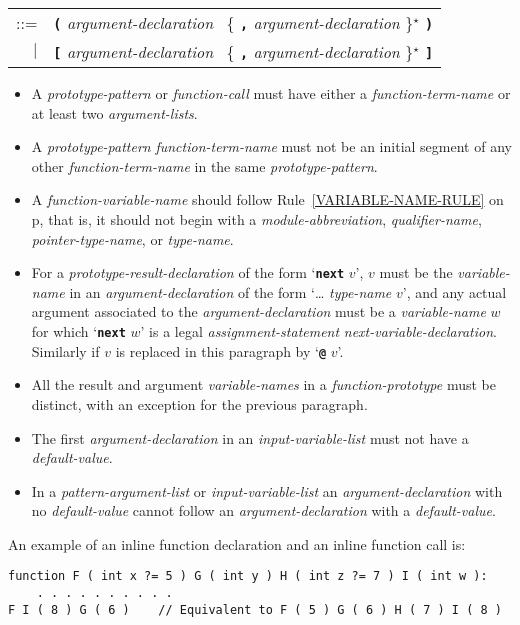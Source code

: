 \documentclass[12pt]{article}
\newcommand{\TT}[1]{{\tt \bfseries #1}}
\newcommand{\STAR}{{\Large $^\star$}}
\newcommand{\pagref}[1]{p\pageref{#1}}
\newenvironment{indpar}[1][0.3in]%
	{\begin{list}{}%
		     {\setlength{\itemsep}{0in}%
		      \setlength{\topsep}{0in}%
		      \setlength{\parsep}{1ex}%
		      \setlength{\labelwidth}{#1}%
		      \setlength{\leftmargin}{#1}%
		      \addtolength{\leftmargin}{\labelsep}}%
	 \item}%
	{\end{list}}
\begin{document}
\begin{indpar}
\begin{tabular}[t]{@{}rl}
    ::= & \TT{(} {\em argument-declaration}~
                 \{ \TT{,} {\em argument-declaration} \}\STAR{} \TT{)} \\
    $|$ & \TT{[} {\em argument-declaration}~
                 \{ \TT{,} {\em argument-declaration} \}\STAR{} \TT{]} \\
    \end{tabular}
\begin{itemize}
\item
A {\em prototype-pattern} or {\em function-call}
must have either a {\em function-term-name}
or at least two {\em argu\-ment-lists}.
\item
A {\em prototype-pattern} {\em function-term-name} must not be
an initial segment of any other {\em function-term-name}
in the same {\em prototype-pattern}.
\item
A {\em function-variable-name} should follow Rule~\ref{VARIABLE-NAME-RULE}
on \pagref{VARIABLE-NAME-RULE}, that is, it
should not begin with a {\em module-abbreviation},
{\em qualifier-name}, {\em pointer-type-name}, or {\em type-name}.
\item
For a {\em prototype-result-declaration} of the form `\TT{next} $v$',
$v$ must be the {\em vari\-able-name} in an {\em argument-declaration}
of the form `\dots{} {\em type-name} $v$', and
any actual argument associated to the {\em argument-declaration}
must be a {\em variable-name} $w$ for which `\TT{next} $w$' is a legal
{\em assignment-statement} {\em next-variable-declaration}.
Similarly if $v$ is replaced in this paragraph by `\TT{@} $v$'.
\item
All the result and argument {\em variable-names}
in a {\em function-prototype} must
be distinct, with an exception for the previous paragraph.
\item
The first {\em argument-declaration} in an {\em input-variable-list}
must not have a {\em default-value}.
\item
In a {\em pattern-argument-list} or {\em input-variable-list}
an {\em argument-declaration} with no {\em de\-fault-value} cannot
follow an {\em argument-declaration} with a {\em default-value}.

\end{itemize}
\end{indpar}

An example of an inline function declaration and an inline function call is:
\begin{indpar}\begin{verbatim}
function F ( int x ?= 5 ) G ( int y ) H ( int z ?= 7 ) I ( int w ):
    . . . . . . . . . .
F I ( 8 ) G ( 6 )    // Equivalent to F ( 5 ) G ( 6 ) H ( 7 ) I ( 8 )
\end{verbatim}\end{indpar}
\end{document}
